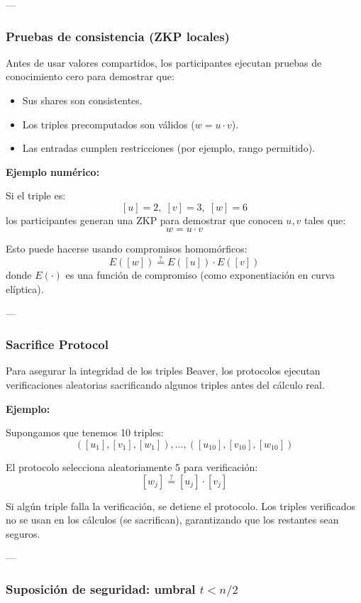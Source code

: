 \documentclass{article}
\begin{document}
---

\subsubsection{Pruebas de consistencia (ZKP locales)}

Antes de usar valores compartidos, los participantes ejecutan pruebas de conocimiento cero para demostrar que:
\begin{itemize}
    \item Sus shares son consistentes.
    \item Los triples precomputados son válidos (\( w = u \cdot v \)).
    \item Las entradas cumplen restricciones (por ejemplo, rango permitido).
\end{itemize}

\textbf{Ejemplo numérico:}

Si el triple es:
\[
[u] = 2, \; [v] = 3, \; [w] = 6
\]
los participantes generan una ZKP para demostrar que conocen \( u, v \) tales que:
\[
w = u \cdot v
\]

Esto puede hacerse usando compromisos homomórficos:
\[
E([w]) \stackrel{?}{=} E([u]) \cdot E([v])
\]
donde \( E(\cdot) \) es una función de compromiso (como exponentiación en curva elíptica).

---

\subsubsection{Sacrifice Protocol}

Para asegurar la integridad de los triples Beaver, los protocolos ejecutan verificaciones aleatorias sacrificando algunos triples antes del cálculo real.

\textbf{Ejemplo:}

Supongamos que tenemos 10 triples:
\[
([u_1], [v_1], [w_1]), \ldots, ([u_{10}], [v_{10}], [w_{10}])
\]

El protocolo selecciona aleatoriamente 5 para verificación:
\[
[w_j] \stackrel{?}{=} [u_j] \cdot [v_j]
\]

Si algún triple falla la verificación, se detiene el protocolo. Los triples verificados no se usan en los cálculos (se sacrifican), garantizando que los restantes sean seguros.

---

\subsubsection{Suposición de seguridad: umbral \( t < n/2 \)}
\end{document}
